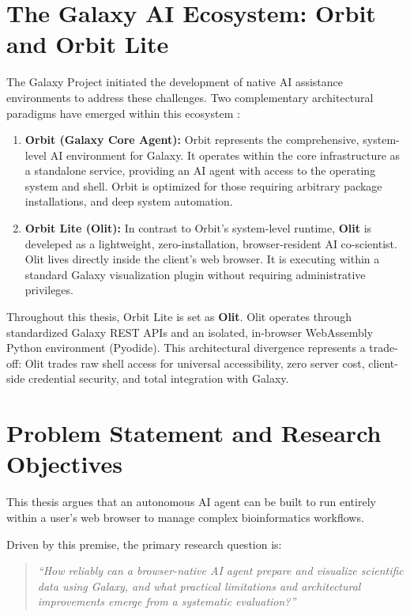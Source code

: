 \section{The Galaxy AI Ecosystem: Orbit and Orbit Lite}
\label{sec:orbit_and_olit}

The Galaxy Project initiated the development of native AI assistance environments to address these challenges. Two complementary architectural paradigms have emerged within this ecosystem :

\begin{enumerate}
    \item \textbf{Orbit (Galaxy Core Agent):} Orbit represents the comprehensive, system-level AI environment for Galaxy. It operates within the core infrastructure as a standalone service, providing an AI agent with access to the operating system and shell. Orbit is optimized for those requiring arbitrary package installations, and deep system automation.
    \item \textbf{Orbit Lite (Olit):} In contrast to Orbit's system-level runtime, \textbf{Olit} is develeped as a lightweight, zero-installation, browser-resident AI co-scientist. Olit lives directly inside the client's web browser. It is executing within a standard Galaxy visualization plugin without requiring administrative privileges.
\end{enumerate}

Throughout this thesis, Orbit Lite is set as \textbf{Olit}. Olit operates through standardized Galaxy REST APIs and an isolated, in-browser WebAssembly Python environment (Pyodide). This architectural divergence represents a trade-off: Olit trades raw shell access for universal accessibility, zero server cost, client-side credential security, and total integration with Galaxy.

\section{Problem Statement and Research Objectives}
\label{sec:objectives}

This thesis argues that an autonomous AI agent can be built to run entirely within a user's web browser to manage complex bioinformatics workflows.

Driven by this premise, the primary research question is:
\begin{quote}
\centering
\textit{``How reliably can a browser-native AI agent prepare and visualize scientific data using Galaxy, and what practical limitations and architectural improvements emerge from a systematic evaluation?''}
\end{quote}

